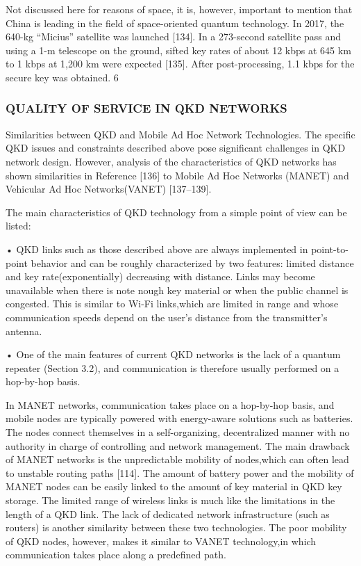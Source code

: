Not discussed here for reasons of space, it is, however, important to mention that China is leading in the field of space-oriented quantum technology. In 2017, the 640-kg “Micius” satellite was launched [134]. In a 273-second satellite pass and using a 1-m telescope on the ground, sifted key rates of about 12 kbps at 645 km to 1 kbps at 1,200 km were expected [135]. After post-processing, 1.1 kbps for the secure key was obtained.
6
\subsubsection{QUALITY OF SERVICE IN QKD NETWORKS}

Similarities between QKD and Mobile Ad Hoc Network Technologies. The specific QKD issues and constraints described above pose significant challenges in QKD network design. However, analysis of the characteristics of QKD networks has shown similarities in Reference [136] to Mobile Ad Hoc Networks (MANET) and Vehicular Ad Hoc Networks(VANET) [137–139].

The main characteristics of QKD technology from a simple point of view can be listed:

• QKD links such as those described above are always implemented in point-to-point behavior and can be roughly characterized by two features: limited distance and key rate(exponentially) decreasing with distance. Links may become unavailable when there is note nough key material or when the public channel is congested. This is similar to Wi-Fi links,which are limited in range and whose communication speeds depend on the user’s distance from the transmitter’s antenna.

• One of the main features of current QKD networks is the lack of a quantum repeater (Section 3.2), and communication is therefore usually performed on a hop-by-hop basis.

In MANET networks, communication takes place on a hop-by-hop basis, and mobile nodes are typically powered with energy-aware solutions such as batteries. The nodes connect themselves in a self-organizing, decentralized manner with no authority in charge of controlling and network management. The main drawback of MANET networks is the unpredictable mobility of nodes,which can often lead to unstable routing paths [114]. The amount of battery power and the mobility of MANET nodes can be easily linked to the amount of key material in QKD key storage. The limited range of wireless links is much like the limitations in the length of a QKD link. The lack of dedicated network infrastructure (such as routers) is another similarity between these two technologies. The poor mobility of QKD nodes, however, makes it similar to VANET technology,in which communication takes place along a predefined path.

